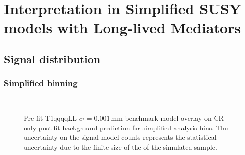 \section{Interpretation in Simplified SUSY models with Long-lived Mediators}
\label{app:LLP}

\subsection{Signal distribution}
\label{app:susyll-mr-plots}

\subsubsection{Simplified binning}

\begin{figure}[h!]
    \centering
     \\
    \caption{
        Pre-fit T1qqqqLL $c\tau=0.001~\mathrm{mm}$ benchmark model overlay on
        CR-only post-fit background prediction for simplified analysis bins.
        The uncertainty on the signal model counts represents the statistical
        uncertainty due to the finite size of the of the simulated sample.
    }
    \label{fig:T1qqqqLL_ctau_0p001_MR_simp}
\end{figure}

